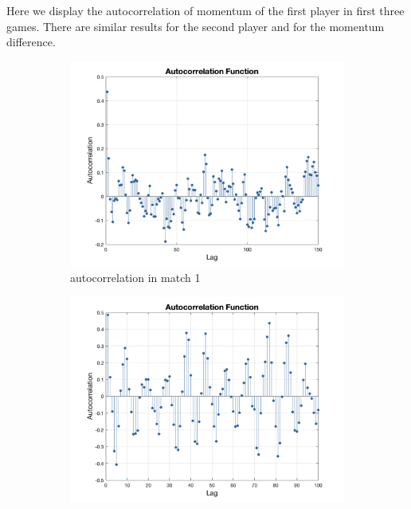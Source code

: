 Here we display the autocorrelation of momentum of the first player in first three games.
There are similar results for the second player and for the momentum difference.

\begin{figure}[H]
    \centering
    \begin{subfigure}[b]{0.34\textwidth}
        \includegraphics[width=\linewidth]{mainmatter/photos/momen_selfco_1.png}
        \caption{autocorrelation in match 1}
    \end{subfigure}\hspace{-0.02\textwidth}
    \begin{subfigure}[b]{0.34\textwidth}
        \includegraphics[width=\linewidth]{mainmatter/photos/momen_selfco_2.png}

\end{subfigure}
\end{figure}
